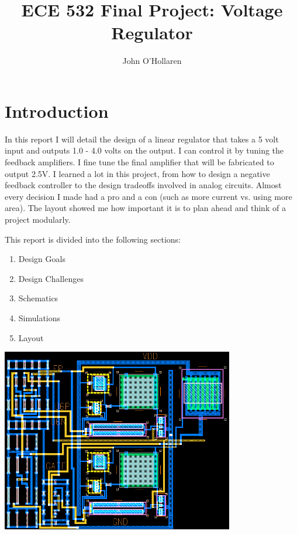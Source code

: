 \documentclass[10pt]{amsart}
\title{ECE 532 Final Project: Voltage Regulator}
\author{John O'Hollaren}
\begin{document}
\maketitle

\section{Introduction}
In this report I will detail the design of a linear regulator that takes a 5 volt input and outputs 1.0 - 4.0 volts on the output. I can control it by tuning the feedback amplifiers. I fine tune the final amplifier that will be fabricated to output 2.5V. I learned a lot in this project, from how to design a negative feedback controller to the design tradeoffs involved in analog circuits. Almost every decision I made had a pro and a con (such as more current vs. using more area). The layout showed me how important it is to plan ahead and think of a project modularly.

This report is divided into the following sections:
\begin{enumerate}
\item Design Goals
\item Design Challenges
\item Schematics
\item Simulations
\item Layout
\end{enumerate}

	\begin{center}
		\includegraphics[width=4in]{Media/lay_final.png}
	\end{center}

\newpage

\end{document}

